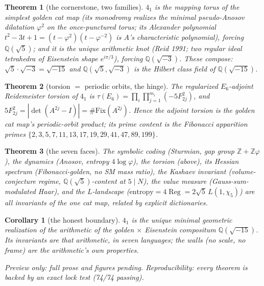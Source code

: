 \documentclass[11pt,reqno]{amsart}
\newtheorem{theorem}{Theorem}
\newtheorem{corollary}{Corollary}
\theoremstyle{definition}
\newcommand{\Q}{\mathbb{Q}}
\newcommand{\Z}{\mathbb{Z}}
\newcommand{\phigold}{\varphi}
\begin{document}
\begin{theorem}[the cornerstone, two families]
$4_1$ is the mapping torus of the simplest golden cat map (its monodromy realizes the
minimal pseudo-Anosov dilatation $\phigold^2$ on the once-punctured torus; its Alexander
polynomial $t^2-3t+1=(t-\phigold^2)(t-\phigold^{-2})$ is $A$'s characteristic polynomial),
forcing $\Q(\sqrt5)$; and it is the unique arithmetic knot (Reid 1991; two regular ideal
tetrahedra of Eisenstein shape $e^{i\pi/3}$), forcing $\Q(\sqrt{-3})$. These compose:
$\sqrt5\cdot\sqrt{-3}=\sqrt{-15}$ and $\Q(\sqrt5,\sqrt{-3})$ is the Hilbert class field of
$\Q(\sqrt{-15})$.
\end{theorem}
\begin{theorem}[torsion $=$ periodic orbits, the hinge]
The regularized $E_6$-adjoint Reidemeister torsion of $4_1$ is
$\tau(E_6)=\prod_i\prod_{j=1}^{m_i}(-5F_{2j}^2)$, and
$5F_{2j}^2=|\det(A^{2j}-I)|=\#\mathrm{Fix}(A^{2j})$. Hence the adjoint torsion is the golden
cat map's periodic-orbit product; its prime content is the Fibonacci apparition primes
$\{2,3,5,7,11,13,17,19,29,41,47,89,199\}$.
\end{theorem}
\begin{theorem}[the seven faces]
The symbolic coding (Sturmian, gap group $\Z+\Z\phigold$), the dynamics (Anosov, entropy
$4\log\phigold$), the torsion (above), its Hessian spectrum (Fibonacci-golden, no SM mass
ratio), the Kashaev invariant (volume-conjecture regime, $\Q(\sqrt5)$-content at $5\mid N$),
the value measure (Gauss-sum-modulated Haar), and the $L$-landscape
($\text{entropy}=4\operatorname{Reg}=2\sqrt5\,L(1,\chi_5)$) are all invariants of the one
cat map, related by explicit dictionaries.
\end{theorem}
\begin{corollary}[the honest boundary]
$4_1$ is the unique minimal geometric realization of the arithmetic of the
golden $\times$ Eisenstein compositum $\Q(\sqrt{-15})$. Its invariants are that arithmetic,
in seven languages; the walls (no scale, no frame) are the arithmetic's own properties.
\end{corollary}

\bigskip
\noindent\textit{Preview only: full prose and figures pending. Reproducibility: every
theorem is backed by an exact lock test (74/74 passing).}
\end{document}
